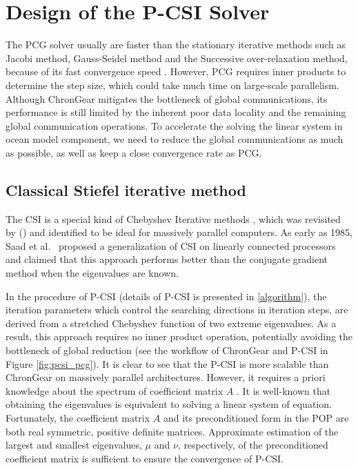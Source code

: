 \section{Design of the P-CSI Solver} \label{se:pcsi}
The PCG  solver usually are faster than the stationary iterative methods such as Jacobi method, Gauss-Seidel method and the Successive over-relaxation method, because of its fast convergence speed \citep{golub2012matrix}.
However, PCG requires  inner products to determine the step size, which could take much time on large-scale parallelism.
Although ChronGear mitigates the bottleneck of global communications, its performance is still limited by the inherent poor data locality and the remaining global communication operations. To accelerate the solving the linear system in ocean model component, we need to reduce the global communications as much as possible, as well as keep a close convergence rate as PCG.

\subsection{Classical Stiefel iterative method}
The CSI is a special kind of Chebyshev Iterative methods \citep{stiefel1958kernel}, which was revisited by \citeauthor{gutknecht2002chebyshev} (\citeyear{gutknecht2002chebyshev})
and identified to be ideal for massively parallel computers. As early as 1985, Saad et al.~\citeyear{saad1985solving} proposed a generalization of CSI on linearly connected processors and claimed that this approach performs better than the conjugate gradient method when the eigenvalues are known.

In the procedure of P-CSI (details of P-CSI is presented in \ref{algorithm}), the iteration parameters which control the searching directions in iteration steps,
are derived from a stretched Chebyshev function of two extreme eigenvalues.
As a result, this approach requires no inner product operation, potentially avoiding the bottleneck of global reduction (see the workflow of ChronGear and P-CSI in Figure \ref{fig:pcsi_pcg}).
It is clear to see that the P-CSI is more scalable than ChronGear on massively parallel architectures. However, it requires a priori knowledge about the spectrum of coefficient matrix $A$ \citep{gutknecht2002chebyshev}. It is well-known that obtaining the eigenvalues is equivalent to solving a linear system of equation.
Fortunately, the coefficient matrix $A$ and its preconditioned form in the POP are both real symmetric, positive definite matrices. Approximate estimation of the largest and smallest eigenvalues, $\mu$ and $\nu$, respectively, of the preconditioned coefficient matrix is sufficient to ensure the convergence of P-CSI.


